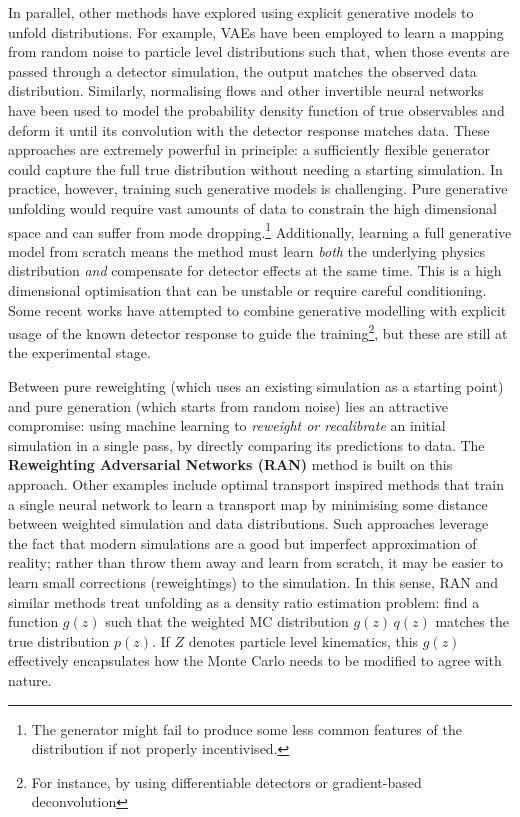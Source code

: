 {{        In parallel, other methods have explored using explicit generative models to unfold distributions.
        For example, VAEs have been employed to learn a mapping from random noise to particle level distributions such that, when those events are passed through a detector simulation, the output matches the observed data distribution.
        Similarly, normalising flows and other invertible neural networks have been used to model the probability density function of true observables and deform it until its convolution with the detector response matches data.
        These approaches are extremely powerful in principle: a sufficiently flexible generator could capture the full true distribution without needing a starting simulation.
        In practice, however, training such generative models is challenging.
        Pure generative unfolding would require vast amounts of data to constrain the high dimensional space and can suffer from mode dropping.\footnote{The generator might fail to produce some less common features of the distribution if not properly incentivised.}
        Additionally, learning a full generative model from scratch means the method must learn \emph{both} the underlying physics distribution \emph{and} compensate for detector effects at the same time.
        This is a high dimensional optimisation that can be unstable or require careful conditioning.
        Some recent works have attempted to combine generative modelling with explicit usage of the known detector response to guide the training\footnote{For instance, by using differentiable detectors or gradient-based deconvolution}, but these are still at the experimental stage.

        Between pure reweighting (which uses an existing simulation as a starting point) and pure generation (which starts from random noise) lies an attractive compromise: using machine learning to \emph{reweight or recalibrate} an initial simulation in a single pass, by directly comparing its predictions to data.
        The \textbf{Reweighting Adversarial Networks (RAN)} method is built on this approach.
        Other examples include optimal transport inspired methods that train a single neural network to learn a transport map by minimising some distance between weighted simulation and data distributions.
        Such approaches leverage the fact that modern simulations are a good but imperfect approximation of reality; rather than throw them away and learn from scratch, it may be easier to learn small corrections (reweightings) to the simulation.
        In this sense, RAN and similar methods treat unfolding as a density ratio estimation problem: find a function $g(z)$ such that the weighted MC distribution $g(z)\,q(z)$ matches the true distribution $p(z)$.
        If $Z$ denotes particle level kinematics, this $g(z)$ effectively encapsulates how the Monte Carlo needs to be modified to agree with nature.
        
}}
